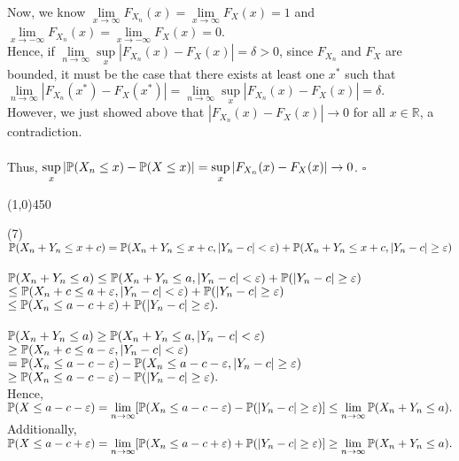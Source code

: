 \documentclass[12pt]{article}
\begin{document}
\noindent
Now, we know $\lim\limits_{x\to\infty} F_{X_n}(x) = \lim\limits_{x\to\infty}F_X(x) = 1$ and 
$\lim\limits_{x\to-\infty} F_{X_n} (x) = \lim\limits_{x\to-\infty} F_X(x) = 0$.\\
Hence, if $\lim\limits_{n\to\infty}\sup\limits_x |F_{X_n}(x)-F_X(x)| = \delta > 0$, since $F_{X_n}$ and $F_X$ are bounded, it must be the case that there exists at least one $x^*$ such that $\lim\limits_{n\to\infty} |F_{X_n}(x^*) - F_X(x^*)| = \lim\limits_{n\to\infty}\sup\limits_x |F_{X_n}(x)-F_X(x)| = \delta.$\\
However, we just showed above that $|F_{X_n}(x)-F_X(x)| \to 0$ for all $x\in\mathbb{R}$, a contradiction.\\ \\
Thus, $\sup\limits_x |\mathbb{P}(X_n \leq x)-\mathbb{P}(X \leq x)| = \sup\limits_x |F_{X_n}(x)-F_X(x)| \to 0$. $\square$

\begin{center}
\line(1,0){450}
\end{center}
\pagebreak

\noindent
(7) $\mathbb{P}(X_n+Y_n\leq x+c) = \mathbb{P}(X_n+Y_n \leq x+c, |Y_n-c| < \varepsilon) + \mathbb{P}(X_n+Y_n \leq x+c,|Y_n-c|\geq \varepsilon)$\\ \\
$\mathbb{P}(X_n+Y_n\leq a) \leq \mathbb{P}(X_n+Y_n \leq a, |Y_n-c| < \varepsilon) + \mathbb{P}(|Y_n-c|\geq \varepsilon)$\\
\indent $\leq \mathbb{P}(X_n+c \leq a+\varepsilon, |Y_n-c| < \varepsilon) + \mathbb{P}(|Y_n-c|\geq \varepsilon)$\\
\indent $\leq \mathbb{P}(X_n \leq a-c+\varepsilon)+ \mathbb{P}(|Y_n-c|\geq \varepsilon).$\\ \\
$\mathbb{P}(X_n+Y_n\leq a) \geq \mathbb{P}(X_n+Y_n \leq a, |Y_n-c| < \varepsilon)$\\
\indent $\geq \mathbb{P}(X_n+c \leq a-\varepsilon, |Y_n-c| < \varepsilon)$\\
\indent $= \mathbb{P}(X_n \leq a-c-\varepsilon)-\mathbb{P}(X_n \leq a-c-\varepsilon, |Y_n-c|\geq \varepsilon)$\\
\indent $\geq \mathbb{P}(X_n \leq a-c-\varepsilon)-\mathbb{P}(|Y_n-c|\geq \varepsilon).$\\

\noindent
Hence, $\mathbb{P}(X\leq a-c-\varepsilon) = \lim\limits_{n\to\infty} [\mathbb{P}(X_n\leq a-c-\varepsilon)-\mathbb{P}(|Y_n-c|\geq \varepsilon)] \leq \lim\limits_{n\to\infty} \mathbb{P}(X_n+Y_n\leq a).$\\

\noindent
Additionally, $\mathbb{P}(X\leq a-c+\varepsilon) = \lim\limits_{n\to\infty} [\mathbb{P}(X_n\leq a-c+\varepsilon)+\mathbb{P}(|Y_n-c|\geq \varepsilon)] \geq \lim\limits_{n\to\infty} \mathbb{P}(X_n+Y_n\leq a).$\\
\end{document}
